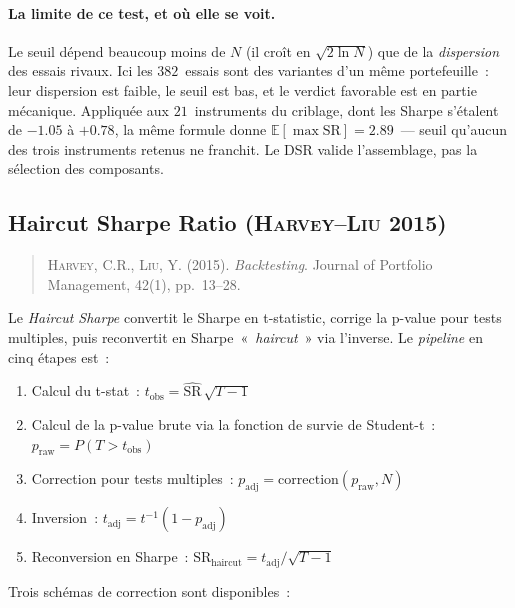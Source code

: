 \paragraph{La limite de ce test, et où elle se voit.} Le seuil dépend beaucoup moins de $N$ (il croît en $\sqrt{2\ln N}$) que de la \emph{dispersion} des essais rivaux. Ici les $382$~essais sont des variantes d'un même portefeuille~: leur dispersion est faible, le seuil est bas, et le verdict favorable est en partie mécanique. Appliquée aux $21$~instruments du criblage, dont les Sharpe s'étalent de $-1.05$ à $+0.78$, la même formule donne $\mathbb{E}[\max \mathrm{SR}] = 2.89$~--- seuil qu'aucun des trois instruments retenus ne franchit. Le DSR valide l'assemblage, pas la sélection des composants.

\subsection{Haircut Sharpe Ratio (\textsc{Harvey--Liu} 2015)}
\label{app:haircut}

\begin{quote}\small
\textsc{Harvey}, C.R., \textsc{Liu}, Y. (2015). \emph{Backtesting}. Journal of Portfolio Management, 42(1), pp.~13--28.
\end{quote}

Le \emph{Haircut Sharpe} convertit le Sharpe en t-statistic, corrige la p-value pour tests multiples, puis reconvertit en Sharpe~«~\textit{haircut}~» via l'inverse. Le \emph{pipeline} en cinq étapes est~:

\begin{enumerate}
\item Calcul du t-stat~: $t_{\text{obs}} = \widehat{\mathrm{SR}} \, \sqrt{T - 1}$
\item Calcul de la p-value brute via la fonction de survie de Student-t~:
      $p_{\text{raw}} = P(T > t_{\text{obs}})$
\item Correction pour tests multiples~: $p_{\text{adj}} = \mathrm{correction}(p_{\text{raw}}, N)$
\item Inversion~: $t_{\text{adj}} = t^{-1}(1 - p_{\text{adj}})$
\item Reconversion en Sharpe~: $\mathrm{SR}_{\text{haircut}} = t_{\text{adj}} / \sqrt{T - 1}$
\end{enumerate}

Trois schémas de correction sont disponibles~:

